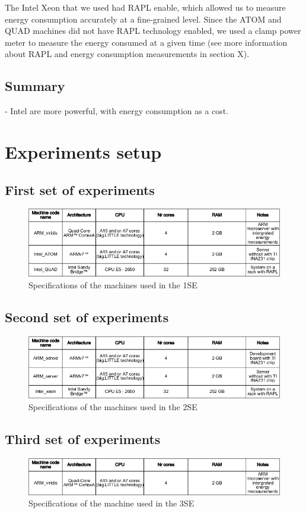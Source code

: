The Intel Xeon that we used had RAPL enable, which allowed us to measure energy
consumption accurately at a fine-grained level. Since the ATOM and QUAD machines
did not have RAPL technology enabled, we used a clamp power meter to measure the
energy consumed at a given time (see more information about RAPL
and energy consumption measurements in section X).


\subsection{Summary}
- Intel are more powerful, with energy consumption as a cost.


\section{Experiments setup}
\subsection{First set of experiments}

\begin{figure}[h!]
  \centering
    \includegraphics[width=150mm]{"img/1se_specs"}
    \caption{Specifications of the machines used in the 1SE}
    \label{fig:1se_specs}
\end{figure}


\subsection{Second set of experiments}


\begin{figure}[h!]
  \centering
    \includegraphics[width=150mm]{"img/2se_specs"}
    \caption{Specifications of the machines used in the 2SE}
    \label{fig:2se_specs}
\end{figure}


\subsection{Third set of experiments}

\begin{figure}[h!]
  \centering
    \includegraphics[width=150mm]{"img/3se_specs"}
    \caption{Specifications of the machine used in the 3SE}
    \label{fig:3se_specs}
\end{figure}




